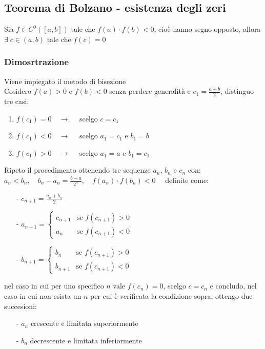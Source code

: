 \documentclass[a4paper]{article}
\newcommand\cont[2]{C^{#1} ({#2})}
\begin{document}
\subsection{Teorema di Bolzano - esistenza degli zeri}
Sia \(f \in \cont{0}{\left[a, b\right]}\) tale che \(f(a) \cdot f(b) < 0\), cioè hanno segno opposto, allora \(\exists \; c \in \left(a, b\right)\)
tale che \(f(c) = 0\)

\subsubsection*{Dimosrtrazione}
Viene impiegato il metodo di bisezione \\
Cosidero \(f(a) > 0\) e \(f(b) < 0\) senza perdere generalità e \(\displaystyle c_1 = \frac{a + b}{2}\), distinguo tre casi:
\begin{enumerate} [topsep=3pt, itemsep=0pt]
	\item \(f(c_1) = 0 \quad \rightarrow \quad\) scelgo \(c = c_1\)
	\item \(f(c_1) < 0 \quad \rightarrow \quad\) scelgo \(a_1 = c_1\) e \(b_1 = b\)
	\item \(f(c_1) > 0 \quad \rightarrow \quad\) scelgo \(a_1 = a\) e \(b_1 = c_1\)
\end{enumerate}
Ripeto il procedimento ottenendo tre sequenze \(a_n\), \(b_n\) e \(c_n\) con: \\
\(a_n < b_n, \quad b_n - a_n = \frac{b-a}{2^n}, \quad f(a_n) \cdot f(b_n) < 0 \quad\) definite come:
\begin{itemize} [topsep=3pt, itemsep=0pt]
	\item[-] \(c_{n+1} = \frac{a_n + b_n}{2}\)
	\item[-] \(a_{n+1} = \begin{cases}
		c_{n+1} &\text{se } f(c_{n+1}) > 0 \\
		a_n & \text{se } f(c_{n+1}) < 0
	\end{cases}\)
	\item[-] \(b_{n+1} = \begin{cases}
		b_n &\text{se } f(c_{n+1}) > 0 \\
		b_{n+1} & \text{se } f(c_{n+1}) < 0
	\end{cases}\)
\end{itemize}
nel caso in cui per uno specifico \(n\) vale \(f(c_n) = 0\), scelgo \(c = c_n\) e concludo, nel caso in cui non esista un \(n\)
per cui è verificata la condizione sopra, ottengo due succesioni:
\begin{itemize} [topsep=3pt, itemsep=0pt]
	\item[-] \(a_n\) crescente e limitata superiormente
	\item[-] \(b_n\) decrescente e limitata inferiormente
\end{itemize}
\end{document}
